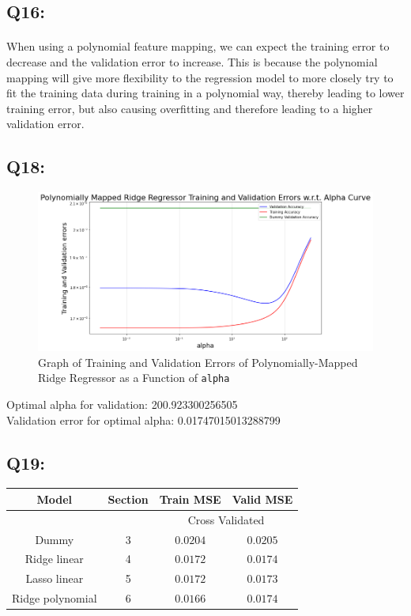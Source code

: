 \documentclass{article}
\newcommand{\code}[1]{\texttt{#1}}
\begin{document}
\subsection*{Q16:}
    \paragraph*{}
    When using a polynomial feature mapping, we can expect the training error to decrease and the validation error to increase. This is because the polynomial mapping will give more flexibility to the regression model to more closely try to fit the training data during training in a polynomial way, thereby leading to lower training error, but also causing overfitting and therefore leading to a higher validation error.

\subsection*{Q18:}
    \begin{figure}[H]
        \centering
        \includegraphics[scale=0.5]{q18.png}
        \caption{Graph of Training and Validation Errors of Polynomially-Mapped Ridge Regressor as a Function of \code{alpha}}
        \label{fig:q8}
    \end{figure}
    Optimal alpha for validation: 200.923300256505\\
    Validation error for optimal alpha: 0.01747015013288799

\subsection*{Q19:}
    \begin{center}
        \begin{tabular}{|c|c|c|c|}
            \hline
            \rowcolor{gray!60}
            Model & Section & Train MSE & Valid MSE\\ \hline
            \rowcolor{gray!20}
            ~&~ & \multicolumn{2}{c|}{Cross Validated}\\ \hline
            Dummy & 3 & $0.0204$ & $0.0205$\\ \hline
            Ridge linear & 4 & $0.0172$ & $0.0174$\\ \hline
            Lasso linear & 5 & $0.0172$ & $0.0173$\\ \hline
            Ridge polynomial & 6 & $0.0166$ & $0.0174$\\ \hline
        \end{tabular}
    \end{center}
\end{document}
